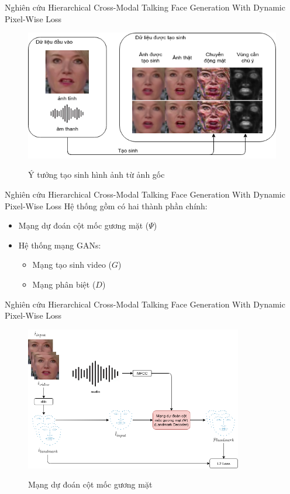 \begin{frame}{Nghiên cứu Hierarchical Cross-Modal Talking Face Generation With Dynamic Pixel-Wise Loss \cite{chen2019}}
    \begin{figure}[H]
    \centering
    \includegraphics[width=12cm]{images/idea-small.png}
    \label{fig:idea}
    \caption{Ý tưởng tạo sinh hình ảnh từ ảnh gốc}
    \end{figure}
\end{frame}

\begin{frame}{Nghiên cứu Hierarchical Cross-Modal Talking Face Generation With Dynamic Pixel-Wise Loss \cite{chen2019}}
Hệ thống gồm có hai thành phần chính:
\begin{itemize}
    \item Mạng dự đoán cột mốc gương mặt ($\Psi$)
    \item Hệ thống mạng GANs:
    \begin{itemize}
        \item Mạng tạo sinh video ($G$)
        \item Mạng phân biệt ($D$)
    \end{itemize}
\end{itemize}
\end{frame}

\begin{frame}{Nghiên cứu Hierarchical Cross-Modal Talking Face Generation With Dynamic Pixel-Wise Loss \cite{chen2019}}
    \begin{figure}[H]
    \centering
    \includegraphics[width=9.5cm]{images/processing-landmark_dec.png}
    \label{fig:processing-landmark_dec}
    \caption{Mạng dự đoán cột mốc gương mặt}
    \end{figure}
\end{frame}

